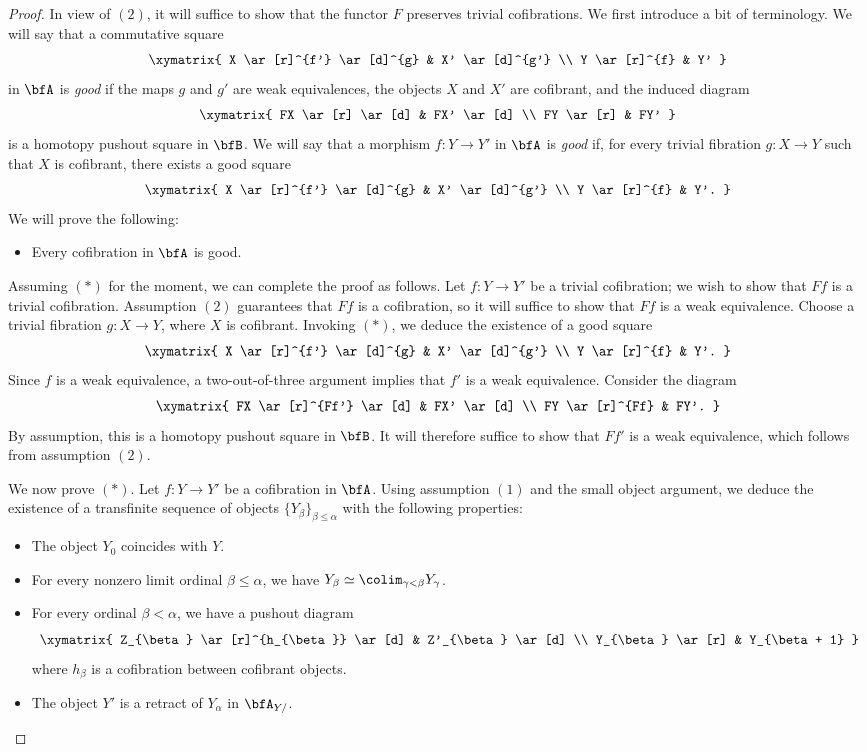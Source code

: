 \begin{proof}
In view of $(2)$, it will suffice to show that the functor $F$ preserves trivial cofibrations.
We first introduce a bit of terminology. We will say that a commutative square
$$ \xymatrix{ X \ar[r]^{f'} \ar[d]^{g} & X' \ar[d]^{g'} \\
Y \ar[r]^{f} & Y' }$$
in ${\bfA}$ is {\it good} if the maps $g$ and $g'$ are weak equivalences, the objects $X$ and $X'$ are cofibrant, and the induced diagram
$$ \xymatrix{ FX \ar[r] \ar[d] & FX' \ar[d] \\
FY \ar[r] & FY' }$$
is a homotopy pushout square in $\bfB$. We will say that a morphism $f: Y \rightarrow Y'$ in
$\bfA$ is {\it good} if, for every trivial fibration $g: X \rightarrow Y$ such that $X$ is cofibrant, there exists a good square
$$ \xymatrix{ X \ar[r]^{f'} \ar[d]^{g} & X' \ar[d]^{g'} \\
Y \ar[r]^{f} & Y'. }$$
We will prove the following:
\begin{itemize}
\item[$(\ast)$] Every cofibration in $\bfA$ is good.
\end{itemize}
Assuming $(\ast)$ for the moment, we can complete the proof as follows. Let $f: Y \rightarrow Y'$ be
a trivial cofibration; we wish to show that $Ff$ is a trivial cofibration. Assumption $(2)$ guarantees that $Ff$ is a cofibration, so it will suffice to show that $Ff$ is a weak equivalence.
Choose a trivial fibration $g: X \rightarrow Y$, where $X$ is cofibrant.
Invoking $(\ast)$, we deduce the existence of a good square
$$ \xymatrix{ X \ar[r]^{f'} \ar[d]^{g} & X' \ar[d]^{g'} \\
Y \ar[r]^{f} & Y'. }$$
Since $f$ is a weak equivalence, a two-out-of-three argument implies that $f'$ is a weak equivalence.
Consider the diagram
$$ \xymatrix{ FX \ar[r]^{Ff'} \ar[d] & FX' \ar[d] \\
FY \ar[r]^{Ff} & FY'. }$$
By assumption, this is a homotopy pushout square in $\bfB$. It will therefore suffice to show that
$Ff'$ is a weak equivalence, which follows from assumption $(2)$.

We now prove $(\ast)$. Let $f: Y \rightarrow Y'$ be a cofibration in $\bfA$. Using assumption $(1)$ and the small object argument, we deduce the existence of a transfinite sequence of objects
$\{ Y_{\beta} \}_{\beta \leq \alpha}$ with the following properties:
\begin{itemize}
\item The object $Y_0$ coincides with $Y$.
\item For every nonzero limit ordinal $\beta \leq \alpha$, we have $Y_{\beta} \simeq \colim_{\gamma < \beta} Y_{\gamma}$.
\item For every ordinal $\beta < \alpha$, we have a pushout diagram
$$ \xymatrix{ Z_{\beta} \ar[r]^{h_{\beta}} \ar[d] & Z'_{\beta} \ar[d] \\
Y_{\beta} \ar[r] & Y_{\beta + 1} }$$
where $h_{\beta}$ is a cofibration between cofibrant objects.
\item The object $Y'$ is a retract of $Y_{\alpha}$ in $\bfA_{Y/}$.
\end{itemize}


\end{proof}
